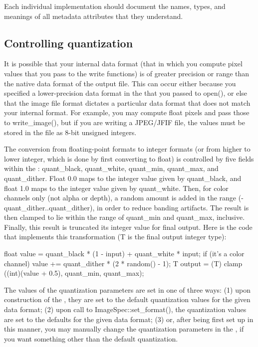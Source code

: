 Each individual \ImageOutput implementation should document the names,
types, and meanings of all metadata attributes that they understand.


\subsection{Controlling quantization}
\label{sec:imageoutput:quantization}

It is possible that your internal data format (that in which you compute
pixel values that you pass to the {\cf write} functions) is of greater
precision or range than the native data format of the output file.  This
can occur either because you specified a lower-precision data format in
the \ImageSpec that you passed to {\cf open()}, or else that the
image file format dictates a particular data format that does not match
your internal format.  For example, you may compute {\cf float} pixels
and pass those to {\cf write_image()}, but if you are writing a
JPEG/JFIF file, the values must be stored in the file as 8-bit unsigned
integers.

The conversion from floating-point formats to integer formats (or from
higher to lower integer, which is done by first converting to float) is
controlled by five fields within the \ImageSpec: {\cf
  quant_black}, {\cf quant_white}, {\cf quant_min}, {\cf quant_max},
and {\cf quant_dither}.
Float 0.0 maps to the integer value given by {\cf quant_black}, and
float 1.0 maps to the integer value given by {\cf quant_white}.  Then,
for color channels only (not alpha or depth), a random amount is added
in the range ({\cf -quant_dither..quant_dither}), in order to reduce
banding artifacts.  The result is then clamped to lie within the range of
{\cf quant_min} and {\cf quant_max}, inclusive.  Finally, this result is
truncated its integer value for final output.  Here is the code that
implements this transformation ({\cf T} is the final output integer
type):

\begin{code}
        float value = quant_black * (1 - input) + quant_white * input;
        if (it's a color channel)
            value += quant_dither * (2 * random() - 1);
        T output = (T) clamp ((int)(value + 0.5), quant_min, quant_max);
\end{code}

The values of the quantization parameters are set in one of three ways:
(1) upon construction of the \ImageSpec, they are set to the
default quantization values for the given data format; (2) upon call to
{\cf ImageSpec::set_format()}, the quantization values are set
to the defaults for the given data format; (3) or, after being first set
up in this manner, you may manually change the quantization parameters
in the \ImageSpec, if you want something other than the default
quantization.

